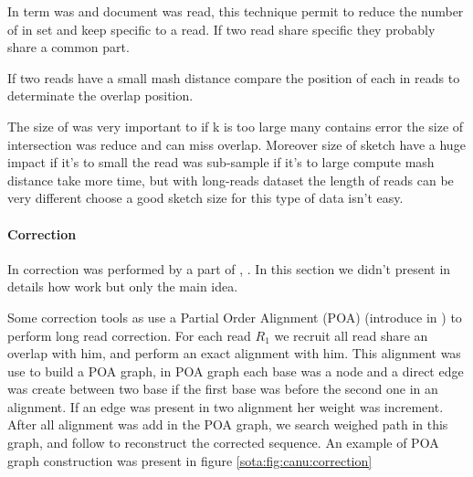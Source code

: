 \documentclass[main]{subfiles}
\begin{document}
In \mhap term was \kmer and document was read, this technique permit to reduce the number of \kmer in set and keep \kmer specific to a read. If two read share specific \kmer they probably share a common part.

If two reads have a small mash distance \mhap compare the position of each \kmer in reads to determinate the overlap position.

The size of \kmer was very important to if k is too large many \kmer contains error the size of intersection was reduce and \mhap can miss overlap. Moreover size of sketch have a huge impact if it's to small the read was sub-sample if it's to large compute mash distance take more time, but with long-reads dataset the length of reads can be very different choose a good sketch size for this type of data isn't easy.


\paragraph{Correction}

In \canu correction was performed by a part of  \cite{falcon}, .  In this section we didn't present in details how  work but only the main idea.

Some correction tools as  use a Partial Order Alignment (POA) (introduce in \cite{poa}) to perform long read correction. For each read \texttt{$R_1$} we recruit all read share an overlap with him, and perform an exact alignment with him. This alignment was use to build a POA graph, in POA graph each base was a node and a direct edge was create between two base if the first base was before the second one in an alignment. If an edge was present in two alignment her weight was increment. After all alignment was add in the POA graph, we search weighed path in this graph, and follow to reconstruct the corrected sequence. An example of POA graph construction was present in figure \ref{sota:fig:canu:correction}
\end{document}
